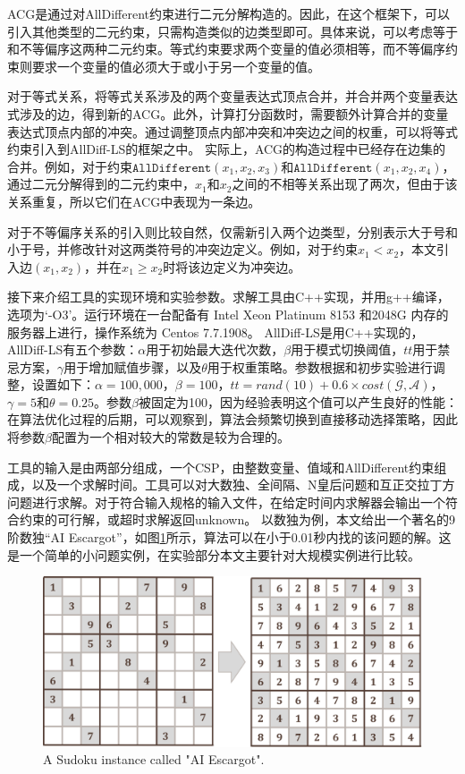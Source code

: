 ACG是通过对AllDifferent约束进行二元分解构造的。因此，在这个框架下，可以引入其他类型的二元约束，只需构造类似的边类型即可。具体来说，可以考虑等于和不等偏序这两种二元约束。等式约束要求两个变量的值必须相等，而不等偏序约束则要求一个变量的值必须大于或小于另一个变量的值。

对于等式关系，将等式关系涉及的两个变量表达式顶点合并，并合并两个变量表达式涉及的边，得到新的ACG。此外，计算打分函数时，需要额外计算合并的变量表达式顶点内部的冲突。通过调整顶点内部冲突和冲突边之间的权重，可以将等式约束引入到AllDiff-LS的框架之中。
实际上，ACG的构造过程中已经存在边集的合并。例如，对于约束$\texttt {AllDifferent}(x_1, x_2, x_3)$和$\texttt {AllDifferent}(x_1, x_2,x_4)$，通过二元分解得到的二元约束中，$x_1$和$x_2$之间的不相等关系出现了两次，但由于该关系重复，所以它们在ACG中表现为一条边。

对于不等偏序关系的引入则比较自然，仅需新引入两个边类型，分别表示大于号和小于号，并修改针对这两类符号的冲突边定义。例如，对于约束$x_1 < x_2$，本文引入边$(x_1, x_2)$，并在$x_1 \geq x_2$时将该边定义为冲突边。

接下来介绍工具的实现环境和实验参数。求解工具由C++实现，并用g++编译，选项为`-O3'。运行环境在一台配备有 Intel Xeon Platinum 8153 和2048G 内存的服务器上进行，操作系统为 Centos 7.7.1908。
AllDiff-LS是用C++实现的，AllDiff-LS有五个参数：$\alpha$用于初始最大迭代次数，$\beta$用于模式切换阈值，$tt$用于禁忌方案，$\gamma$用于增加赋值步骤，以及$\theta$用于权重策略。参数根据\cite{dorne1999tabu}和初步实验进行调整，设置如下：$\alpha=100,000$，$\beta=100$，$tt=rand(10)+0.6\times cost(\mathcal{G}, \mathcal{A})$，$\gamma=5$和$\theta=0.25$。参数$\beta$被固定为100，因为经验表明这个值可以产生良好的性能：在算法优化过程的后期，可以观察到，算法会频繁切换到直接移动选择策略，因此将参数$\beta$配置为一个相对较大的常数是较为合理的。

工具的输入是由两部分组成，一个CSP，由整数变量、值域和AllDifferent约束组成，以及一个求解时间。工具可以对大数独、全间隔、N皇后问题和互正交拉丁方问题进行求解。对于符合输入规格的输入文件，在给定时间内求解器会输出一个符合约束的可行解，或超时求解返回unknown。
以数独为例，本文给出一个著名的9阶数独“AI Escargot”，如图\ref{fig:Sudoku}所示，算法可以在小于0.01秒内找的该问题的解。这是一个简单的小问题实例，在实验部分本文主要针对大规模实例进行比较。

\begin{figure}[]
    \centering
    \includegraphics[width=\columnwidth]{Img/Sudoku.png}
     {A Sudoku instance called "AI Escargot".}
    \label{fig:Sudoku}
\end{figure}

